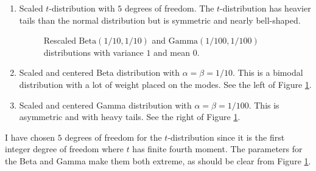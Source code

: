 \documentclass{article}
\theoremstyle{plain}
\theoremstyle{plain}
\theoremstyle{definition}
\theoremstyle{remark}
\theoremstyle{definition}
\theoremstyle{plain}
\theoremstyle{plain}
\theoremstyle{definition}
\begin{document}
\begin{enumerate}
\item Scaled $t$-distribution with $5$ degrees of freedom. The $t$-distribution
has heavier tails than the normal distribution but is symmetric and nearly bell-shaped. 
\begin{figure}
	\centering     %
	\caption{Rescaled $\textrm{Beta}(1/10, 1/10)$ and $\textrm{Gamma}(1/100, 1/100)$ distributions with variance $1$ and mean $0$.}
	\label{fig::distributions}
\end{figure}

\item Scaled and centered Beta distribution with $\alpha=\beta=1/10$. This is a bimodal distribution with a lot of weight placed on the modes. See the left of Figure \ref{fig::distributions}.
\item Scaled and centered Gamma distribution with $\alpha=\beta=1/100$. This is asymmetric and with heavy tails. See the right of Figure \ref{fig::distributions}.
\end{enumerate}

I have chosen $5$ degrees of freedom for the $t$-distribution since it is the first integer degree of freedom where $t$ has finite fourth moment. The parameters for the Beta and Gamma make them both extreme, as should be clear from Figure \ref{fig::distributions}.
\end{document}
